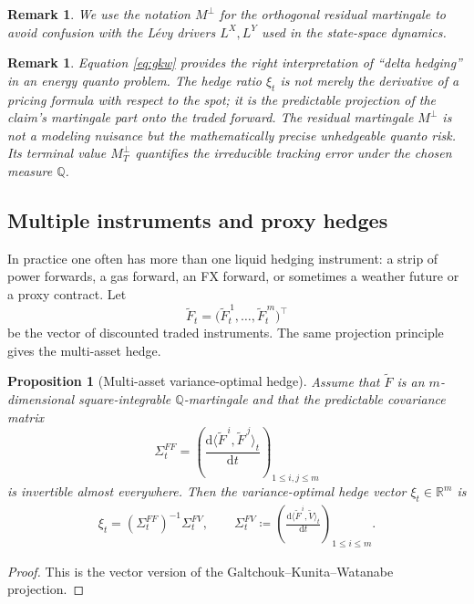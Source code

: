 \documentclass[10pt,a4paper,reqno]{amsart}
\newtheorem{proposition}[theorem]{Proposition}
\newtheorem{remark}[theorem]{Remark}
\newcommand{\R}{\mathbb{R}}
\newcommand{\Q}{\mathbb{Q}}
\newcommand{\1}{\mathbbm{1}}
\newcommand{\dd}{\mathrm{d}}
\begin{document}
\begin{remark}
We use the notation $M^{\perp}$ for the orthogonal residual martingale to
avoid confusion with the Lévy drivers $L^X, L^Y$ used in the state-space
dynamics.
\end{remark}

\begin{remark}
Equation \eqref{eq:gkw} provides the right interpretation of ``delta hedging''
in an energy quanto problem. The hedge ratio $\xi_t$ is not merely the
derivative of a pricing formula with respect to the spot; it is the predictable
projection of the claim's martingale part onto the traded forward. The residual
martingale $M^{\perp}$ is not a modeling nuisance but the mathematically
precise unhedgeable quanto risk. Its terminal value $M^{\perp}_T$ quantifies
the irreducible tracking error under the chosen measure $\Q$.
\end{remark}

\subsection{Multiple instruments and proxy hedges}

In practice one often has more than one liquid hedging instrument: a strip of
power forwards, a gas forward, an FX forward, or sometimes a weather future or a
proxy contract. Let
$$
\widetilde{F}_t = \big(\widetilde{F}_t^{\,1},\dots,\widetilde{F}_t^{\,m}\big)^\top
$$
be the vector of discounted traded instruments. The same projection principle
gives the multi-asset hedge.

\begin{proposition}[Multi-asset variance-optimal hedge]
\label{prop:multi_hedge}
Assume that $\widetilde{F}$ is an $m$-dimensional square-integrable
$\Q$-martingale and that the predictable covariance matrix
$$
\Sigma_t^{FF}
= \left(
    \frac{\dd \langle \widetilde{F}^{\,i},\widetilde{F}^{\,j}\rangle_t}{\dd t}
  \right)_{1 \le i,j \le m}
$$
is invertible almost everywhere. Then the variance-optimal hedge vector
$\xi_t \in \R^m$ is
\begin{align}\label{eq:multi_hedge}
  \xi_t
  = (\Sigma_t^{FF})^{-1} \Sigma_t^{FV},
  \qquad
  \Sigma_t^{FV}
  \coloneqq \left(
    \frac{\dd \langle \widetilde{F}^{\,i},\widetilde{V}\rangle_t}{\dd t}
  \right)_{1 \le i \le m}.
\end{align}
\end{proposition}

\begin{proof}
This is the vector version of the Galtchouk--Kunita--Watanabe projection.
\end{proof}
\end{document}
